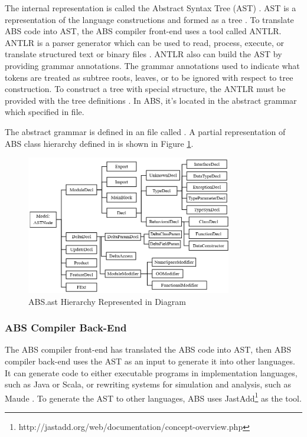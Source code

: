 The internal representation is called the Abstract Syntax Tree (AST) \citep{thesis.niken.deltaRelationalMappingUsingABS,paper.wong.abstools}. AST is a representation of the language constructions and formed as a tree \citep{paper.hedin.jastadd}. To translate ABS code into AST, the ABS compiler front-end uses a tool called ANTLR. ANTLR is a parser generator which can be used to read, process, execute, or translate structured text or binary files \citep{web.ANTLR.aboutANTRLParser}. ANTLR also can build the AST by providing grammar annotations. The grammar annotations used to indicate what tokens are treated as subtree roots, leaves, or to be ignored with respect to tree construction. To construct a tree with special structure, the ANTLR must be provided with the tree definitions \citep{web.ANTLR.ANTRLTreeConstruction}. In ABS, it's located in the abstract grammar which specified in  file.

The abstract grammar is defined in an  file called . A partial representation of ABS class hierarchy defined in  is shown in Figure \ref{fig:ABSastHierarchy}.

\begin{figure}
	\centering
	\includegraphics[width=0.8\textwidth]
	{pics/ABSastHierarchy.png}
	\caption{ABS.ast Hierarchy Represented in Diagram}
	\label{fig:ABSastHierarchy}
\end{figure}

\subsubsection{ABS Compiler Back-End}\label{ABSBackEnd}
The ABS compiler front-end has translated the ABS code into AST, then ABS compiler back-end uses the AST as an input to generate it into other languages. It can generate code to either executable programs in implementation languages, such as Java or Scala, or rewriting systems for simulation and analysis, such as Maude \citep{paper.wong.abstools}. To generate the AST to other languages, ABS uses JastAdd\footnote{http://jastadd.org/web/documentation/concept-overview.php} as the tool.

